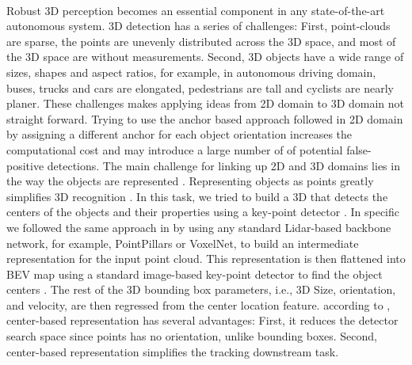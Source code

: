 \documentclass[10pt,twocolumn,letterpaper]{article}
\begin{document}
\paragraph{} 
Robust 3D perception becomes an essential component in any state-of-the-art autonomous system. 3D detection has a series of challenges: First, point-clouds are sparse, the points are unevenly distributed across the 3D space, and most of the 3D space are without measurements. Second, 3D objects have a wide range of sizes, shapes and aspect ratios, for example, in autonomous driving domain, buses, trucks and cars are elongated, pedestrians are tall and cyclists are nearly planer. These challenges makes applying ideas from 2D domain to 3D domain not straight forward. Trying to use the anchor based approach followed in 2D domain by assigning a different anchor for each object orientation increases the computational cost and may introduce a large number of of potential false-positive detections. The main challenge for linking up 2D and 3D domains lies in the way the objects are represented \cite{yang20203dssd}. Representing objects as points greatly simplifies 3D recognition \cite{yin2020center}. In this task, we tried to build a 3D that detects the centers of the objects and their properties using a key-point detector \cite{zhou2019objects}. In specific we followed the same approach in \cite{yin2020center, ge2020afdet} by using any standard Lidar-based backbone network, for example, PointPillars or VoxelNet, to build an intermediate representation for the input point cloud. This representation is then flattened into BEV map using a standard image-based key-point detector to find the object centers \cite{zhou2019objects}. The rest of the 3D bounding box parameters, i.e., 3D Size, orientation, and velocity, are then regressed from the center location feature. according to \cite{yin2020center}, center-based representation has several advantages: First, it reduces the detector search space since points has no orientation, unlike bounding boxes. Second, center-based representation simplifies the tracking downstream task.
\end{document}
